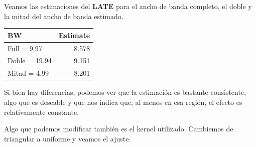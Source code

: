 \documentclass[
  letterpaper,
  DIV=11,
  numbers=noendperiod,
  oneside]{scrreprt}
\newenvironment{Shaded}{\begin{snugshade}}{\end{snugshade}}
\newcommand{\AttributeTok}[1]{\textcolor[rgb]{0.40,0.45,0.13}{#1}}
\newcommand{\CommentTok}[1]{\textcolor[rgb]{0.37,0.37,0.37}{#1}}
\newcommand{\DecValTok}[1]{\textcolor[rgb]{0.68,0.00,0.00}{#1}}
\newcommand{\FloatTok}[1]{\textcolor[rgb]{0.68,0.00,0.00}{#1}}
\newcommand{\FunctionTok}[1]{\textcolor[rgb]{0.28,0.35,0.67}{#1}}
\newcommand{\NormalTok}[1]{\textcolor[rgb]{0.00,0.23,0.31}{#1}}
\newcommand{\OtherTok}[1]{\textcolor[rgb]{0.00,0.23,0.31}{#1}}
\newcommand{\SpecialCharTok}[1]{\textcolor[rgb]{0.37,0.37,0.37}{#1}}
\newcommand{\StringTok}[1]{\textcolor[rgb]{0.13,0.47,0.30}{#1}}
\begin{document}
Veamos las estimaciones del \textbf{LATE} para el ancho de banda
completo, el doble y la mitad del ancho de banda estimado.

\begin{Shaded}
\end{Shaded}

\begin{table}
\fontsize{12.0pt}{14.4pt}\selectfont
\begin{tabular*}{\linewidth}{@{\extracolsep{\fill}}lr}
\toprule
BW & Estimate \\ 
\midrule\addlinespace[2.5pt]
Full = 9.97 & 8.578 \\ 
Doble = 19.94 & 9.151 \\ 
Mitad = 4.99 & 8.201 \\ 
\bottomrule
\end{tabular*}
\end{table}

Si bien hay diferencias, podemos ver que la estimación es bastante
consistente, algo que es deseable y que nos indica que, al menos en esa
región, el efecto es relativamente constante.

Algo que podemos modificar también es el kernel utilizado. Cambiemos de
triangular a uniforme y veamos el ajuste.

\begin{Shaded}
\end{Shaded}
\end{document}
